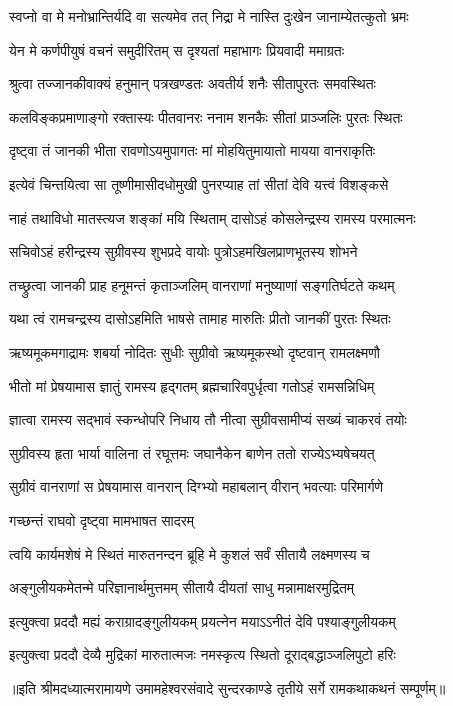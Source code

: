 \twolineshloka
{स्वप्नो वा मे मनोभ्रान्तिर्यदि वा सत्यमेव तत्}
{निद्रा मे नास्ति दुःखेन जानाम्येतत्कुतो भ्रमः} %

\twolineshloka
{येन मे कर्णपीयुषं वचनं समुदीरितम्}
{स दृश्यतां महाभागः प्रियवादी ममाग्रतः} %

\twolineshloka
{श्रुत्वा तज्जानकीवाक्यं हनुमान् पत्रखण्डतः}
{अवतीर्य शनैः सीतापुरतः समवस्थितः} %

\twolineshloka
{कलविङ्कप्रमाणाङ्गो रक्तास्यः पीतवानरः}
{ननाम शनकैः सीतां प्राञ्जलिः पुरतः स्थितः} %

\twolineshloka
{दृष्ट्वा तं जानकी भीता रावणोऽयमुपागतः}
{मां मोहयितुमायातो मायया वानराकृतिः} %

\twolineshloka
{इत्येवं चिन्तयित्वा सा तूष्णीमासीदधोमुखी}
{पुनरप्याह तां सीतां देवि यत्त्वं विशङ्कसे} %

\twolineshloka
{नाहं तथाविधो मातस्त्यज शङ्कां मयि स्थिताम्}
{दासोऽहं कोसलेन्द्रस्य रामस्य परमात्मनः} %

\twolineshloka
{सचिवोऽहं हरीन्द्रस्य सुग्रीवस्य शुभप्रदे}
{वायोः पुत्रोऽहमखिलप्राणभूतस्य शोभने} %

\twolineshloka
{तच्छ्रुत्वा जानकी प्राह हनूमन्तं कृताञ्जलिम्}
{वानराणां मनुष्याणां सङ्गतिर्घटते कथम्} %

\twolineshloka
{यथा त्वं रामचन्द्रस्य दासोऽहमिति भाषसे}
{तामाह मारुतिः प्रीतो जानकीं पुरतः स्थितः} %

\twolineshloka
{ऋष्यमूकमगाद्रामः शबर्या नोदितः सुधीः}
{सुग्रीवो ऋष्यमूकस्थो दृष्टवान् रामलक्ष्मणौ} %

\twolineshloka
{भीतो मां प्रेषयामास ज्ञातुं रामस्य हृद्गतम्}
{ब्रह्मचारिवपुर्धृत्वा गतोऽहं रामसन्निधिम्} %

\twolineshloka
{ज्ञात्वा रामस्य सद्भावं स्कन्धोपरि निधाय तौ}
{नीत्वा सुग्रीवसामीप्यं सख्यं चाकरवं तयोः} %

\twolineshloka
{सुग्रीवस्य हृता भार्या वालिना तं रघूत्तमः}
{जघानैकेन बाणेन ततो राज्येऽभ्यषेचयत्} %

\twolineshloka
{सुग्रीवं वानराणां स प्रेषयामास वानरान्}
{दिग्भ्यो महाबलान् वीरान् भवत्याः परिमार्गणे} %

\onelineshloka
{गच्छन्तं राघवो दृष्ट्वा मामभाषत सादरम्} %

\twolineshloka
{त्वयि कार्यमशेषं मे स्थितं मारुतनन्दन}
{ब्रूहि मे कुशलं सर्वं सीतायै लक्ष्मणस्य च} %

\twolineshloka
{अङ्गुलीयकमेतन्मे परिज्ञानार्थमुत्तमम्}
{सीतायै दीयतां साधु मन्नामाक्षरमुद्रितम्} %

\twolineshloka
{इत्युक्त्वा प्रददौ मह्यं कराग्रादङ्गुलीयकम्}
{प्रयत्नेन मयाऽऽनीतं देवि पश्याङ्गुलीयकम्} %

\twolineshloka
{इत्युक्त्वा प्रददौ देव्यै मुद्रिकां मारुतात्मजः}
{नमस्कृत्य स्थितो दूराद्बद्धाञ्जलिपुटो हरिः} %

॥इति श्रीमदध्यात्मरामायणे उमामहेश्वरसंवादे सुन्दरकाण्डे तृतीये सर्गे रामकथाकथनं सम्पूर्णम्॥

\closesection